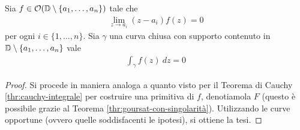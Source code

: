 \begin{corollary}
	Sia $f \in \mathcal{O}(\mathbb{D} \setminus \{a_1, \dots, a_n\})$ tale che
	\begin{equation*}
	\begin{aligned}
	\lim_{z\to a_i} (z-a_i)f(z) = 0
	\end{aligned}
	\end{equation*}
	per ogni $i \in \{1, \dots, n\}$. Sia $\gamma$ una curva chiusa con supporto contenuto in $\mathbb{D} \setminus  \{a_1, \dots, a_n\}$ vale
	\begin{equation*}
	\begin{aligned}
	\int_{\gamma} f(z)\ dz = 0
	\end{aligned}
	\end{equation*}
\end{corollary}
\begin{proof}
	Si procede in maniera analoga a quanto visto per il Teorema di Cauchy \ref{thr:cauchy-integrale} per costruire una primitiva di $f$, denotiamola $F$ (questo è possibile grazie al Teorema \ref{thr:goursat-con-singolarità}). Utilizzando le curve opportune (ovvero quelle soddisfacenti le ipotesi), si ottiene la tesi.
\end{proof}
